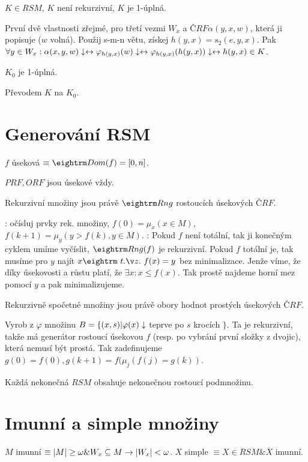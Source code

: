  $K \in RSM$, $K$ není rekurzivní, $K$ je 1-úplná.

\prf{} První dvě vlastnosti zřejmé, pro třetí vezmi $W_x$ a $ČRF \alpha(y,x,w)$,
která ji popisuje ($w$ volná). Použij s-m-n větu, získej $h(y,x) = s_2(e,y,x)$. Pak
$\forall y \in W_x: \alpha(x,y,w)\downarrow \leftrightarrow \varphi_{h(y,x)}(w)\downarrow \leftrightarrow  \varphi_{h(y,x)}(h(y,x))\downarrow \leftrightarrow h(y,x) \in K$.

 $K_0$ je 1-úplná.

\prf{} Převodem $K$ na $K_0$.

\section{Generování RSM}

\dfn $f$ úseková $\equiv \dom(f) = [0,n]$.

\obs{} $PRF, ORF$ jsou úsekové vždy.

 Rekurzivní množiny jsou právě $\rng$ rostoucích úsekových $ČRF$. 

\prf{}

\itemize\ibull
\: \uv{$\then$}: očísluj prvky rek. množiny, $f(0) = \mu_x(x \in M)$, $f(k+1) = \mu_y(y > f(k), y \in M)$.
\: \uv{$\leftarrow$}: Pokud $f$ není totální, tak ji konečným cyklem umíme
vyčíslit, $\rng(f)$ je rekurzivní.  Pokud $f$ totální je, tak musíme pro $y$
najít $x \st f(x) = y$ bez minimalizace. Jenže víme, že díky úsekovosti a růstu
platí, že $\exists x: x \le f(x)$. Tak prostě najdeme horní mez pomocí $y$ a
pak minimalizujeme.
\endlist

\thm{} Rekurzivně spočetné množiny jsou právě obory hodnot prostých úsekových $ČRF$.

\prf{} Vyrob z $\varphi$ množinu $B = \{(x,s) | \varphi(x) \downarrow$ teprve po $s$ krocích $\}$.
Ta je rekurzivní, takže má generátor rostoucí úsekovou $f$ (resp. po vybrání první složky z dvojic),
která nemusí být prostá. Tak zadefinujeme $g(0) = f(0), g(k+1) = f(\mu_j(f(j) = g(k))$.

\thm{} Každá nekonečná $RSM$ obsahuje nekonečnou rostoucí podmnožinu.
 
\section{Imunní a simple množiny}

\dfn $M$ imunní $\equiv |M| \ge \omega \& W_x \subseteq M \rightarrow |W_x| < \omega$. 
\dfn $X$ simple $\equiv X \in RSM \& \overline{X}$ imunní.

